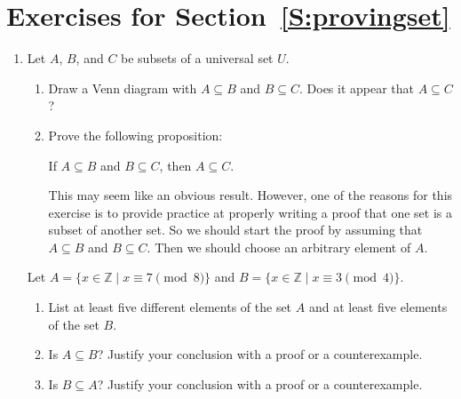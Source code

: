 \section*{Exercises for Section~\ref{S:provingset}}
%
\begin{enumerate}
\xitem Let  $A = \left\{ {\left. {x \in \mathbb{R}} \right| x^2  < 4} \right\}$  and let  $B = \left\{ {x \in \mathbb{R}\left.  \right| x < 2} \right\}$. \label{exer:sec42-2}

\begin{enumerate}
  \item Is  $A \subseteq B$?  Justify your conclusion with a proof or a counterexample.
  \item Is  $B \subseteq A$?  Justify your conclusion with a proof or a counterexample.
\end{enumerate}

\item Let  $A$, $B$, and  $C$  be subsets of a universal set  $U$.  \label{exer:sec42-3}

\begin{enumerate}
  \item Draw a Venn diagram with  $A \subseteq B$  and  $B \subseteq C$.  Does it appear that  $A \subseteq C$?

  \item Prove the following proposition:
  \begin{center}
    If  $A \subseteq B$ and $B \subseteq C$, then  $A \subseteq C$.
  \end{center}

\note  This may seem like an obvious result.  However, one of the reasons for this exercise is to provide practice at properly writing a proof that one set is a subset of another set.  So we should start the proof by assuming that  $A \subseteq B$ and  $B \subseteq C$.  Then we should choose an arbitrary element of  $A$.
\end{enumerate}

\xitem Let  $A = \{ x \in \mathbb{Z} \mid x \equiv 7 \pmod 8 \}$ and 
$B = \{ x \in \mathbb{Z} \mid x \equiv 3 \pmod 4 \}$.
\label{exer:modsubset}%
\begin{enumerate}
\item List at least five different elements of the set $A$ and at least five elements of the set $B$.
\item Is $A \subseteq B$?  Justify your conclusion with a proof or a counterexample.
\item Is $B \subseteq A$?  Justify your conclusion with a proof or a counterexample.
\end{enumerate}


\end{enumerate}
